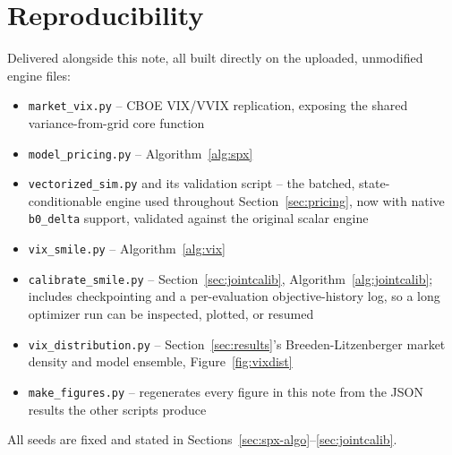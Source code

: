 \documentclass[11pt]{article}
\begin{document}
\section*{Reproducibility}
Delivered alongside this note, all built directly on the uploaded,
unmodified engine files:
\begin{itemize}
\item \texttt{market\_vix.py} -- CBOE VIX/VVIX replication, exposing
the shared variance-from-grid core function
\item \texttt{model\_pricing.py} -- Algorithm~\ref{alg:spx}
\item \texttt{vectorized\_sim.py} and its validation script -- the
batched, state-conditionable engine used throughout
Section~\ref{sec:pricing}, now with native \texttt{b0\_delta} support,
validated against the original scalar engine
\item \texttt{vix\_smile.py} -- Algorithm~\ref{alg:vix}
\item \texttt{calibrate\_smile.py} -- Section~\ref{sec:jointcalib},
Algorithm~\ref{alg:jointcalib}; includes checkpointing and a
per-evaluation objective-history log, so a long optimizer run can be
inspected, plotted, or resumed
\item \texttt{vix\_distribution.py} -- Section~\ref{sec:results}'s
Breeden-Litzenberger market density and model ensemble,
Figure~\ref{fig:vixdist}
\item \texttt{make\_figures.py} -- regenerates every figure in this
note from the JSON results the other scripts produce
\end{itemize}
All seeds are fixed and stated in
Sections~\ref{sec:spx-algo}--\ref{sec:jointcalib}.
\end{document}
